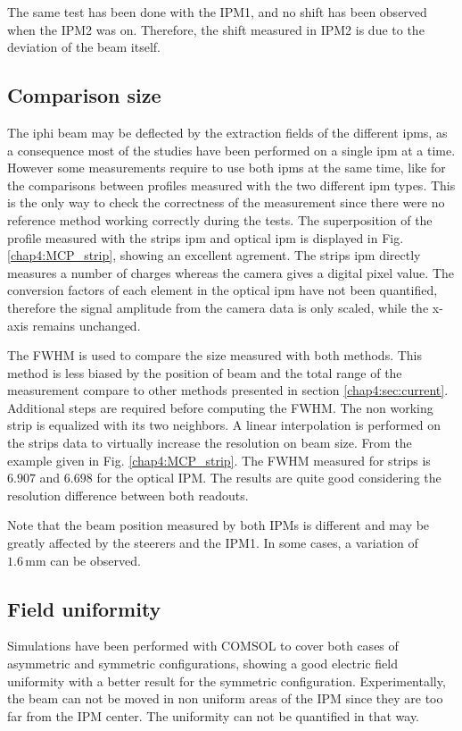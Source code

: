 \begin{refsection}
  The same test has been done with the IPM1, and no shift has been observed when the IPM2 was on. Therefore, the shift measured in IPM2 is due to the deviation of the beam itself.

  

  \subsection{Comparison size }
  The \acrshort{iphi} beam may be deflected by the extraction fields of the different \acrshort{ipm}s, as a consequence most of the studies have been performed on a single \acrshort{ipm} at a time. However some measurements require to use both \acrshort{ipm}s at the same time, like for the comparisons between profiles measured with the two different \acrshort{ipm} types. This is the only way to check the correctness of the measurement since there were no reference method working correctly during the tests.
  The superposition of the profile measured with the strips \acrshort{ipm} and optical \acrshort{ipm} is displayed in Fig. \ref{chap4:MCP_strip}, showing an excellent agrement. The strips \acrshort{ipm} directly measures a number of charges whereas the camera gives a digital pixel value. The conversion factors of each element in the optical \acrshort{ipm} have not been quantified, therefore the signal amplitude from the camera data is only scaled, while the x-axis remains unchanged.
  

  The FWHM is used to compare the size measured with both methods. This method is less biased by the position of beam and the total range of the measurement
  compare to other methods presented in section \ref{chap4:sec:current}.
  Additional steps are required before computing the FWHM.
  The non working strip is equalized with its two neighbors. A linear interpolation is performed on the strips data to virtually increase the resolution on beam size. From the example given in Fig. \ref{chap4:MCP_strip}. The FWHM measured for strips is $6.907$ and $6.698$ for the optical IPM.
  The results are quite good considering the resolution difference between both readouts.
  
  Note that the beam position measured by both IPMs is different and may be greatly affected by the steerers and the IPM1. In some cases, a variation of $1.6\,\mathrm{mm}$ can be observed.

  \subsection{Field uniformity}
  \label{chap4:sec:field_uniformity}
  Simulations have been performed with COMSOL to cover both cases of asymmetric and symmetric configurations, showing a good electric field uniformity with a better result for the symmetric configuration. Experimentally, the beam can not be moved in non uniform areas of the IPM since they are too far from the IPM center. The uniformity can not be quantified in that way.


\end{refsection}

